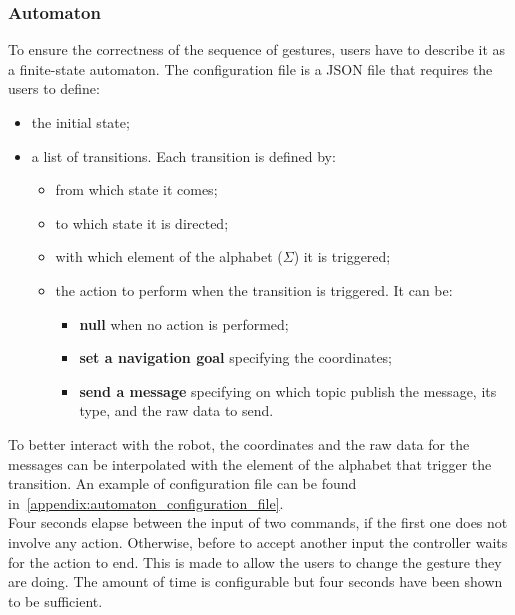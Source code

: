 \documentclass[../thesis.tex]{subfiles}
\begin{document}
\subsubsection{Automaton}\label{sss:automaton_methodology}
To ensure the correctness of the sequence of gestures, users have to describe it as a finite-state automaton. The configuration file is a JSON file that requires the users to define:
\begin{itemize}
    \item the initial state;
    \item a list of transitions. Each transition is defined by:
    \begin{itemize}
        \item from which state it comes;
        \item to which state it is directed;
        \item with which element of the alphabet ($\Sigma$) it is triggered;
        \item the action to perform when the transition is triggered. It can be:
        \begin{itemize}
            \item \textbf{null} when no action is performed;
            \item \textbf{set a navigation goal} specifying the coordinates;
            \item \textbf{send a message} specifying on which topic publish the message, its type, and the raw data to send.
        \end{itemize}
    \end{itemize}
\end{itemize}
To better interact with the robot, the coordinates and the raw data for the messages can be interpolated with the element of the alphabet that trigger the transition. An example of configuration file can be found in~\ref{appendix:automaton_configuration_file}.\\

Four seconds elapse between the input of two commands, if the first one does not involve any action. Otherwise, before to accept another input the controller waits for the action to end. This is made to allow the users to change the gesture they are doing. The amount of time is configurable but four seconds have been shown to be sufficient.\\
\end{document}
